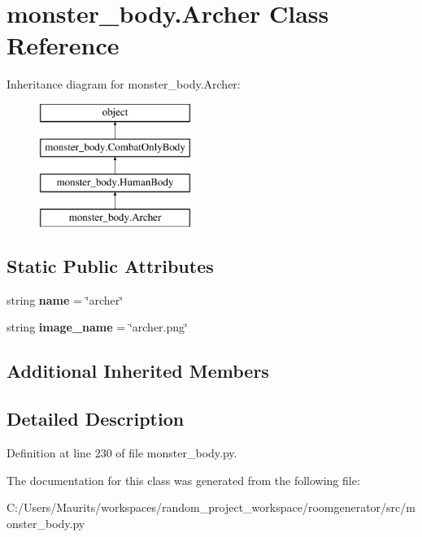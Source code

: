 \hypertarget{classmonster__body_1_1_archer}{}\section{monster\+\_\+body.\+Archer Class Reference}
\label{classmonster__body_1_1_archer}
Inheritance diagram for monster\+\_\+body.\+Archer\+:\begin{figure}[H]
\begin{center}
\leavevmode
\includegraphics[height=4.000000cm]{classmonster__body_1_1_archer}
\end{center}
\end{figure}
\subsection*{Static Public Attributes}
\begin{DoxyCompactItemize}
\item 
\hypertarget{classmonster__body_1_1_archer_a54dade672d3b73cd1816bac4b69b5fc9}{}string {\bfseries name} = \char`\"{}archer\char`\"{}\label{classmonster__body_1_1_archer_a54dade672d3b73cd1816bac4b69b5fc9}

\item 
\hypertarget{classmonster__body_1_1_archer_af4f07a776d7efab03bec72e3f2f81187}{}string {\bfseries image\+\_\+name} = \char`\"{}archer.\+png\char`\"{}\label{classmonster__body_1_1_archer_af4f07a776d7efab03bec72e3f2f81187}

\end{DoxyCompactItemize}
\subsection*{Additional Inherited Members}


\subsection{Detailed Description}


Definition at line 230 of file monster\+\_\+body.\+py.



The documentation for this class was generated from the following file\+:\begin{DoxyCompactItemize}
\item 
C\+:/\+Users/\+Maurits/workspaces/random\+\_\+project\+\_\+workspace/roomgenerator/src/monster\+\_\+body.\+py\end{DoxyCompactItemize}
